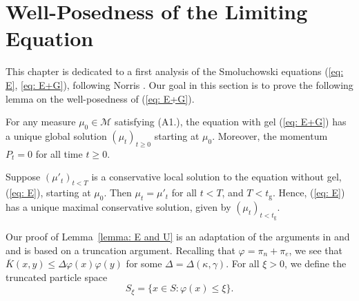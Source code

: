 \section{Well-Posedness of the Limiting Equation}\label{sec:SE}  This chapter is dedicated to a first analysis of the Smoluchowski equations (\ref{eq: E}, \ref{eq: E+G}), following Norris \cite{N99, N00}. Our goal in this section is to prove the following lemma on the well-posedness of (\ref{eq: E+G}).

\begin{lemma}\label{lemma: E and U} For any measure $\mu_0 \in \mathcal{M}$ satisfying (A1.), the equation with gel (\ref{eq: E+G}) has a unique global solution $(\mu_t)_{t\geq 0}$ starting at $\mu_0$. Moreover, the momentum $P_t=0$ for all time $t\ge 0$. \end{lemma}
\begin{corollary}\label{cor: maximal conservative solutions} Suppose $(\mu'_t)_{t<T}$ is a conservative local solution to the equation without gel, (\ref{eq: E}), starting at $\mu_0$. Then $\mu_t=\mu'_t$ for all $t<T$, and $T<t_\mathrm{g}$. Hence, (\ref{eq: E}) has a unique maximal conservative solution, given by $(\mu_t)_{t<t_\mathrm{g}}$.
\end{corollary}

Our proof of Lemma~\ref{lemma: E and U} is an adaptation of the arguments in \cite[Section 2]{N99} and \cite[Section 2]{N00} and is based on a truncation argument. Recalling that $\varphi=\pi_n+\pi_e$, we see that  $\overline{K}(x,y)\leq \Delta\varphi(x)\varphi(y)$ for some $\Delta=\Delta(\kappa, \gamma).$ For all $\xi>0$, we define the truncated particle space \begin{equation} \label{d:trunc_space} S_\xi=\{x\in S: \varphi(x) \le \xi\}. \end{equation}

